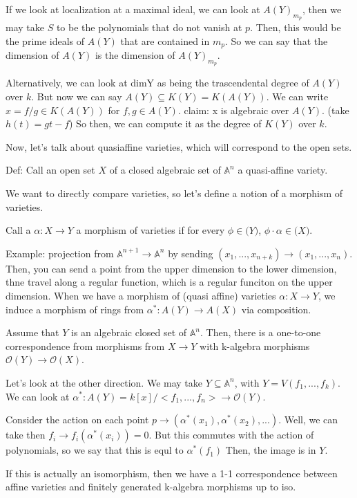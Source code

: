 \documentclass[10pt]{article}
\begin{document}
If we look at localization at a maximal ideal, we can look at $A(Y)_{m_p}$, then we may take $S$ to be the polynomials that do not vanish at $p$. Then, this would be the prime ideals of $A(Y)$ that are contained in $m_p$. So we can say that the dimension of $A(Y)$ is the dimension of $A(Y)_{m_p}$.

Alternatively, we can look at dimY as being the trascendental degree of $A(Y)$ over $k$. But now we can say $A(Y) \subseteq K(Y) = K(A(Y))$. We can write $x = f/g \in K(A(Y))$ for $f,g \in A(Y)$. claim: x is algebraic over $A(Y)$. (take $h(t) =  gt - f$) So then, we can compute it as the degree of $K(Y)$ over $k$.

Now, let’s talk about quasiaffine varieties, which will correspond to the open sets. 

Def: Call an open set $X$ of a closed algebraic set of $\mathbb{A}^n$ a quasi-affine variety.

We want to directly compare varieties, so let’s define a notion of a morphism of varieties.

Call a $\alpha: X \to Y$ a morphism of varieties if for every $\phi \in \mathcal(Y)$, $\phi \cdot \alpha \in \mathcal(X)$.

Example: projection from $\mathbb{A}^{n+1} \to \mathbb{A}^n$ by sending $(x_1,...,x_{n+k}) \to (x_1,...,x_n)$. Then, you can send a point from the upper dimension to the lower dimension, thne travel along a regular function, which is a regular funciton on the upper dimension. When we have a morphism of (quasi affine) varieties $\alpha: X \to Y$, we induce a morphism of rings from $\alpha^*: A(Y) \to A(X)$ via composition. 

Assume that $Y$ is an algebraic closed set of $\mathbb{A}^n$. Then, there is a one-to-one correspondence from morphisms from $X \to Y$ with k-algebra morphisms $\mathcal{O}(Y) \to \mathcal{O}(X)$.

Let’s look at the other direction. We may take $Y\subseteq \mathbb{A}^n$, with $Y = V(f_1,...,f_k)$. We can look at $\alpha^*: A(Y) = k[x]/<f_1,...,f_n> \to \mathcal{O}(Y)$. 

Consider the action on each point $p \to (\alpha^*(x_1), \alpha^*(x_2),...)$. Well, we can take then $f_i \to f_i(\alpha^*(x_i)) = 0$. But this commutes with the action of polynomials, so we say that this is equl to $\alpha^*(f_1)$ Then, the image is in $Y$. 

If this is actually an isomorphism, then we have a 1-1 correspondence between affine varieties and finitely generated k-algebra morphisms up to iso.
\end{document}
